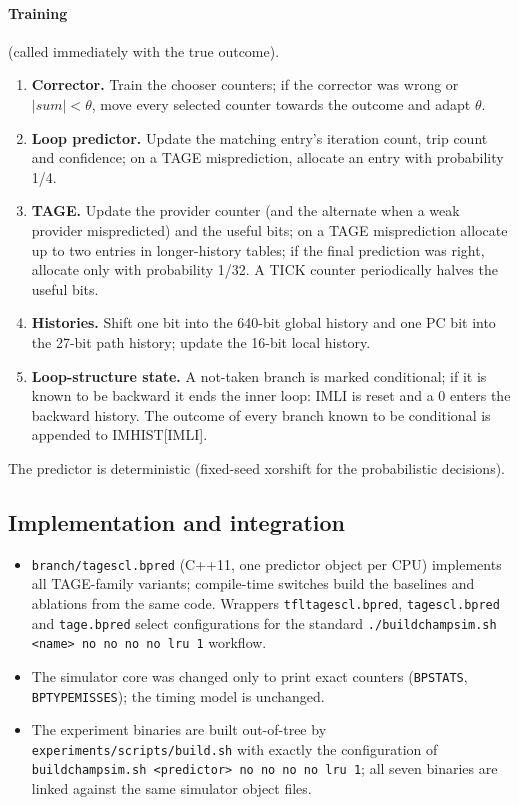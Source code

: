 \documentclass[11pt,a4paper]{article}
\newcommand{\code}[1]{\texttt{#1}}
\renewcommand{\_}{\textunderscore\allowbreak}
\begin{document}
\paragraph{Training} (called immediately with the true outcome).
\begin{enumerate}
\item \textbf{Corrector.} Train the chooser counters; if the corrector was wrong or $|\mathit{sum}| < \theta$, move every selected counter towards the outcome and adapt $\theta$.
\item \textbf{Loop predictor.} Update the matching entry's iteration count, trip count and confidence; on a TAGE misprediction, allocate an entry with probability 1/4.
\item \textbf{TAGE.} Update the provider counter (and the alternate when a weak provider mispredicted) and the useful bits; on a TAGE misprediction allocate up to two entries in longer-history tables; if the final prediction was right, allocate only with probability 1/32. A TICK counter periodically halves the useful bits.
\item \textbf{Histories.} Shift one bit into the 640-bit global history and one PC bit into the 27-bit path history; update the 16-bit local history.
\item \textbf{Loop-structure state.} A not-taken branch is marked conditional; if it is known to be backward it ends the inner loop: IMLI is reset and a 0 enters the backward history. The outcome of every branch known to be conditional is appended to IMHIST[IMLI].
\end{enumerate}
The predictor is deterministic (fixed-seed xorshift for the probabilistic decisions).

\subsection{Implementation and integration}
\begin{itemize}
\item \code{branch/tagescl.bpred} (C++11, one predictor object per CPU) implements all TAGE-family variants; compile-time switches build the baselines and ablations from the same code. Wrappers \code{tfl\_tage\_scl.bpred}, \code{tage\_scl.bpred} and \code{tage.bpred} select configurations for the standard \code{./build\_champsim.sh <name> no no no no lru 1} workflow.
\item The simulator core was changed only to print exact counters (\code{BP\_STATS}, \code{BP\_TYPE\_MISSES}); the timing model is unchanged.
\item The experiment binaries are built out-of-tree by \code{experiments/scripts/build.sh} with exactly the configuration of \code{build\_champsim.sh <predictor> no no no no lru 1}; all seven binaries are linked against the same simulator object files.
\end{itemize}
\end{document}
